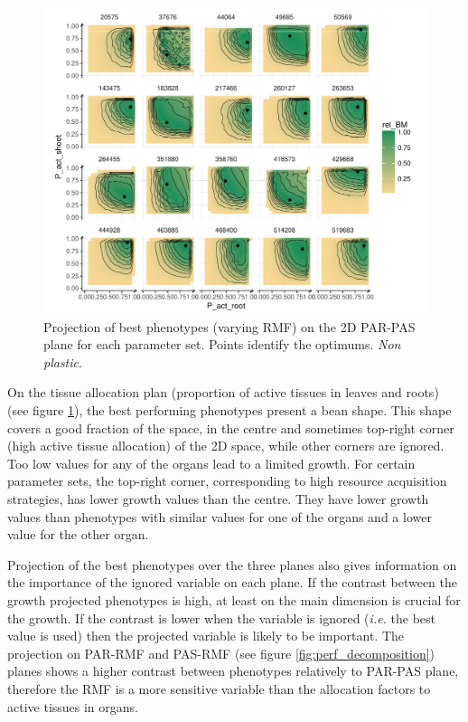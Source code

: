 \begin{figure}\label{fig:best_phenotypes}
\includegraphics[width = \textwidth]{./2_PP/Figures/Landscape/landscape_PAR-PAS.pdf}
\caption{Projection of best phenotypes (varying RMF) on the 2D PAR-PAS plane for each parameter set. Points identify the optimums. \textit{Non plastic}.}
\end{figure}

 On the tissue allocation plan (proportion of active tissues in leaves and roots) (see figure \ref{fig:best_phenotypes}), the best performing phenotypes present a bean shape. This shape covers a good fraction of the space, in the centre and sometimes top-right corner (high active tissue allocation) of the 2D space, while other corners are ignored. Too low values for any of the organs lead to a limited growth. For certain parameter sets, the top-right corner, corresponding to high resource acquisition strategies, has lower growth values than the centre. They have lower growth values than phenotypes with similar values for one of the organs and a lower value for the other organ.  %
 

Projection of the best phenotypes over the three planes also gives information on the importance of the ignored variable on each plane. If the contrast between the growth projected phenotypes is high, at least on the main dimension is crucial for the growth. If the contrast is lower when the variable is ignored (\textit{i.e.} the best value is used) then the projected variable is likely to be important. The projection on PAR-RMF and PAS-RMF (see figure \ref{fig:perf_decomposition}) planes shows a higher contrast between phenotypes relatively to PAR-PAS plane, therefore the RMF is a more sensitive variable than the allocation factors to active tissues in organs.



